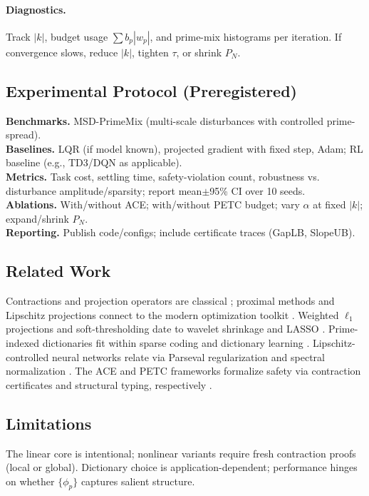 \documentclass[11pt]{article}
\theoremstyle{definition}
\theoremstyle{remark}
\newcommand{\1}{\mathbf{1}}
\begin{document}
\paragraph{Diagnostics.} Track $|k|$, budget usage $\sum b_p|w_p|$, and prime-mix histograms per iteration. If convergence slows, reduce $|k|$, tighten $\tau$, or shrink $P_N$.

\subsection{Experimental Protocol (Preregistered)}
\textbf{Benchmarks.} MSD-PrimeMix (multi-scale disturbances with controlled prime-spread).\\
\textbf{Baselines.} LQR (if model known), projected gradient with fixed step, Adam; RL baseline (e.g., TD3/DQN as applicable).\\
\textbf{Metrics.} Task cost, settling time, safety-violation count, robustness vs. disturbance amplitude/sparsity; report mean$\pm$95\% CI over 10 seeds.\\
\textbf{Ablations.} With/without ACE; with/without PETC budget; vary $\alpha$ at fixed $|k|$; expand/shrink $P_N$.\\
\textbf{Reporting.} Publish code/configs; include certificate traces (GapLB, SlopeUB).

\subsection{Related Work}
Contractions and projection operators are classical \cite{BauschkeCombettes2017}; proximal methods and Lipschitz projections connect to the modern optimization toolkit \cite{ParikhBoyd2014}. Weighted $\ell_1$ projections and soft-thresholding date to wavelet shrinkage \cite{DonohoJohnstone1994} and LASSO \cite{Tibshirani1996}. Prime-indexed dictionaries fit within sparse coding and dictionary learning \cite{MallatZhang1993,OlshausenField1996,Mairal2010}. Lipschitz-controlled neural networks relate via Parseval regularization \cite{Cisse2017Parseval} and spectral normalization \cite{Miyato2018SN}. The ACE and PETC frameworks formalize safety via contraction certificates and structural typing, respectively \cite{VanOsdolACE,VanGelderPETC}.

\subsection{Limitations}
The linear core is intentional; nonlinear variants require fresh contraction proofs (local or global). Dictionary choice is application-dependent; performance hinges on whether $\{\phi_p\}$ captures salient structure.
\end{document}
